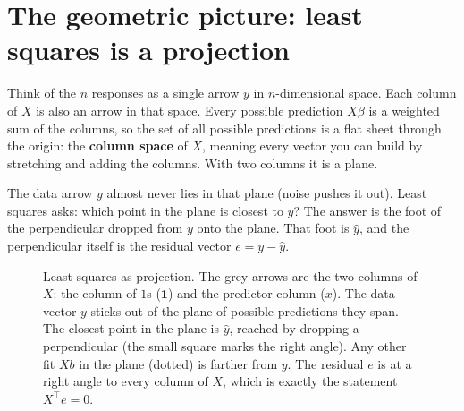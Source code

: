 \section{The geometric picture: least squares is a projection}
\label{sec:mlr-geometry}

Think of the $n$ responses as a single arrow $y$ in $n$-dimensional space. Each column of
$X$ is also an arrow in that space. Every possible prediction $X\beta$ is a weighted
sum of the columns, so the set of all possible predictions is a flat sheet through the
origin: the \textbf{column space} of $X$, meaning every vector you can build by
stretching and adding the columns. With two columns it is a plane.

The data arrow $y$ almost never lies in that plane (noise pushes it out). Least squares
asks: which point in the plane is closest to $y$? The answer is the foot of the
perpendicular dropped from $y$ onto the plane. That foot is $\hat y$, and the
perpendicular itself is the residual vector $e = y - \hat y$.

\begin{figure}[H]
\centering
{}
\caption{Least squares as projection. The grey arrows are the two columns of $X$: the
column of $1$s ($\mathbf 1$) and the predictor column ($x$). The data vector $y$ sticks out
of the plane of possible predictions they span. The closest point in the plane is $\hat y$, reached by dropping a
perpendicular (the small square marks the right angle). Any other fit $Xb$ in the plane
(dotted) is farther from $y$. The residual $e$ is at a right angle to every column of $X$,
which is exactly the statement $X^\top e = 0$.}
\label{fig:mlr-projection}
\end{figure}

